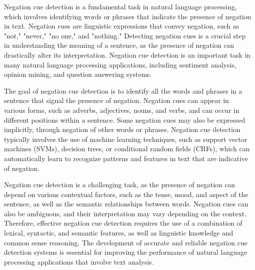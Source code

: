Negation cue detection is a fundamental task in natural language processing, which involves identifying words or phrases that indicate the presence of negation in text. Negation cues are linguistic expressions that convey negation, such as "not," "never," "no one," and "nothing." Detecting negation cues is a crucial step in understanding the meaning of a sentence, as the presence of negation can drastically alter its interpretation. Negation cue detection is an important task in many natural language processing applications, including sentiment analysis, opinion mining, and question answering systems.

The goal of negation cue detection is to identify all the words and phrases in a sentence that signal the presence of negation. Negation cues can appear in various forms, such as adverbs, adjectives, nouns, and verbs, and can occur in different positions within a sentence. Some negation cues may also be expressed implicitly, through negation of other words or phrases. Negation cue detection typically involves the use of machine learning techniques, such as support vector machines (SVMs), decision trees, or conditional random fields (CRFs), which can automatically learn to recognize patterns and features in text that are indicative of negation.

Negation cue detection is a challenging task, as the presence of negation can depend on various contextual factors, such as the tense, mood, and aspect of the sentence, as well as the semantic relationships between words. Negation cues can also be ambiguous, and their interpretation may vary depending on the context. Therefore, effective negation cue detection requires the use of a combination of lexical, syntactic, and semantic features, as well as linguistic knowledge and common sense reasoning. The development of accurate and reliable negation cue detection systems is essential for improving the performance of natural language processing applications that involve text analysis.





